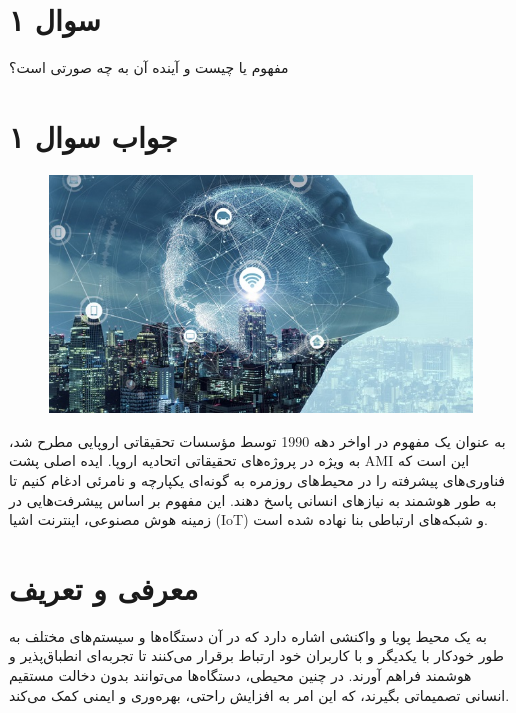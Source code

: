 \section*{سوال ۱}

مفهوم
یا
چیست و آینده آن به چه صورتی است؟

\section*{جواب سوال ۱}

\begin{figure}[H]
	\centering
	\includegraphics{pic1.jpg}
	\label{fig:label4}
\end{figure}

به عنوان یک مفهوم در اواخر دهه 1990 توسط مؤسسات تحقیقاتی اروپایی مطرح شد، به ویژه در پروژه‌های تحقیقاتی اتحادیه اروپا. ایده اصلی پشت AMI این است که فناوری‌های پیشرفته را در محیط‌های روزمره به گونه‌ای یکپارچه و نامرئی ادغام کنیم تا به طور هوشمند به نیازهای انسانی پاسخ دهند. این مفهوم بر اساس پیشرفت‌هایی در زمینه هوش مصنوعی، اینترنت اشیا (IoT) و شبکه‌های ارتباطی بنا نهاده شده است.
\section*{معرفی و تعریف}

به یک محیط پویا و واکنشی اشاره دارد که در آن دستگاه‌ها و سیستم‌های مختلف به طور خودکار با یکدیگر و با کاربران خود ارتباط برقرار می‌کنند تا تجربه‌ای انطباق‌پذیر و هوشمند فراهم آورند. در چنین محیطی، دستگاه‌ها می‌توانند بدون دخالت مستقیم انسانی تصمیماتی بگیرند، که این امر به افزایش راحتی، بهره‌وری و ایمنی کمک می‌کند.


